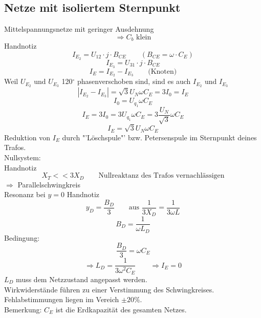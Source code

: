 \documentclass[a4,paper,fleqn]{article}
\begin{document}
\subsection{Netze mit isoliertem Sternpunkt}
Mittelspannungsnetze mit geringer Ausdehnung
\[ \Rightarrow C_b \text{ klein} \]
Handnotiz
\[ I_{E_2} = U_{12} \cdot j \cdot B_{CE} \qquad (B_{CE} = \omega \cdot C_E) \]
\[ I_{E_3} = U_{31} \cdot j \cdot B_{CE} \]
\[ I_E = I_{E_2} - I_{E_3} \qquad \text{(Knoten)} \]
Weil $U_{E_2}$ und $U_{E_3}$ 120$^\circ$ phasenverschoben sind, sind es auch $I_{E_2}$ und $I_{E_3}$
\[ \boxed{\left|I_{E_2} - I_{E_3}\right| = \sqrt{3} U_N \omega C_E = 3 I_0 = I_E} \]
\[ I_0 = U_{q_1} \omega C_E \]
\[ I_E = 3 I_0 = 3 U_{q_1} \omega C_E = 3 \frac{U_N}{\sqrt{3}} \omega C_E \]
\[ I_E = \sqrt{3} U_N \omega C_E \]
Reduktion von $I_E$ durch "'Löschspule"' bzw. Petersenspule im Sternpunkt 
deines Trafos. 
\\Nullsystem: 
\\ Handnotiz
\[ X_T << 3 X_D \qquad \text{Nullreaktanz des Trafos vernachlässigen} \]
$\Rightarrow$ Parallelschwingkreis\\
Resonanz bei $y = 0$
Handnotiz
\[ y_D = \frac{B_D}{3} \qquad \text{aus } \frac{1}{3 X_D} = \frac{1}{3\omega L} \]
\[ B_D = \frac{1}{\omega L_D} \]
Bedingung: 
\[ \frac{B_D}{3} = \omega C_E \]
\[ \Rightarrow \boxed{L_D = \frac{1}{3 \omega^2 C_E}} \qquad \Rightarrow I_E = 0 \]
$L_D$ muss dem Netzzustand angepasst werden. \\
Wirkwiderstände führen zu einer Verstimmung des Schwingkreises. \\
Fehlabstimmungen liegen im Vereich $\pm 20\%$. \\
Bemerkung: $C_E$ ist die Erdkapazität des gesamten Netzes. 
\end{document}

